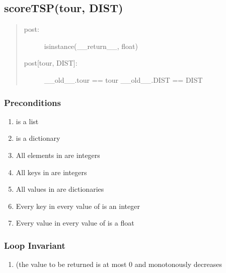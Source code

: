 \documentclass[letterpaper,10pt,english]{sphinxmanual}
\begin{document}
\subsection{scoreTSP(tour, DIST)}
\label{contracts:scoretsp-tour-dist}\begin{quote}
\begin{description}
\item[{post:}] \leavevmode
isinstance(\_\_return\_\_, float)

\item[{post{[}tour, DIST{]}:}] \leavevmode
\_\_old\_\_.tour == tour
\_\_old\_\_.DIST == DIST

\end{description}
\end{quote}


\subsubsection{Preconditions}
\label{contracts:id27}\begin{enumerate}
\item {} 
 is a list

\item {} 
 is a dictionary

\item {} 
All elements in  are integers

\item {} 
All keys in  are integers

\item {} 
All values in  are dictionaries

\item {} 
Every key in every value of  is an integer

\item {} 
Every value in every value of  is a float

\end{enumerate}


\subsubsection{Loop Invariant}
\label{contracts:loop-invariant}\begin{enumerate}
\item {} 
 (the value to be returned is at most 0 and monotonously decreases

\end{enumerate}
\end{document}
